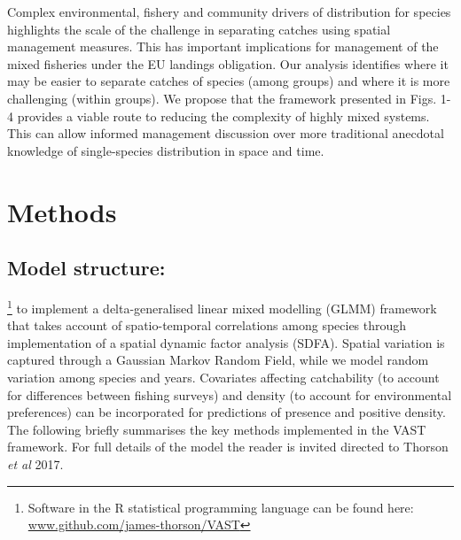 \documentclass{nature}
\begin{document}
\begin{linenumbers}


Complex environmental, fishery and community drivers of distribution for
species highlights the scale of the challenge
in separating catches using
spatial management measures. This has important implications for management of
the mixed fisheries under the EU landings obligation. Our analysis identifies
where it may be easier to separate catches of species (among groups) and where
it is more challenging (within groups). We propose that the framework presented
in Figs. 1-4 provides a viable route to reducing the complexity of highly mixed
systems.  This can allow informed management discussion over more traditional
anecdotal knowledge of single-species distribution in space and time.


\section*{Methods}

\subsection{Model structure:} \footnote{Software in the R
	statistical programming language can be found here:
	\url{www.github.com/james-thorson/VAST}} to implement a
delta-generalised linear mixed modelling (GLMM) framework that takes account of
spatio-temporal correlations among species through implementation of a spatial
dynamic factor analysis (SDFA). Spatial variation is captured through a
Gaussian Markov Random Field, while we model random variation among species and
years. Covariates affecting catchability (to account for differences between
fishing surveys) and density (to account for environmental preferences) can be
incorporated for predictions of presence and positive density. The following
briefly summarises the key methods implemented in the VAST framework. For full
details of the model the reader is invited directed to Thorson \textit{et al}
2017\cite{Thorson2017}.


\end{linenumbers}
\end{document}
